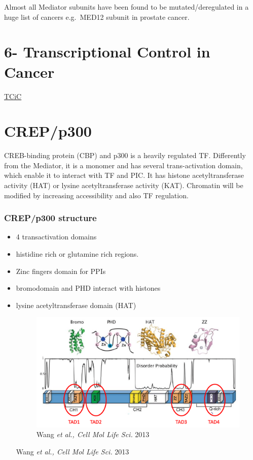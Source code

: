 Almost all Mediator subunits have been found to be mutated/deregulated in a huge list of cancers e.g.~MED12 subunit in prostate cancer.

\hypertarget{transcriptional-control-in-cancer}{%
\section{6- Transcriptional Control in Cancer}\label{transcriptional-control-in-cancer}}

\href{https://www.notion.so/TCiC-08701b51973a4b22a16e226a1fbd7e9b}{TCiC}

\hypertarget{crepp300}{%
\section{CREP/p300}\label{crepp300}}

CREB-binding protein (CBP) and p300 is a heavily regulated TF. Differently from the Mediator, it is a monomer and has several trans-activation domain, which enable it to interact with TF and PIC. It has histone acetyltransferase activity (HAT) or lysine acetyltransferase activity (KAT). Chromatin will be modified by increasing accessibility and also TF regulation.

\hypertarget{crepp300-structure}{%
\subsubsection{CREP/p300 structure}\label{crepp300-structure}}

\begin{itemize}
\item
  4 transactivation domains
\item
  histidine rich or glutamine rich regions.
\item
  Zinc fingers domain for PPIs
\item
  bromodomain and PHD interact with histones
\item
  lysine acetyltransferase domain (HAT)

  \begin{figure}
  \centering
  \includegraphics[width=\textwidth]{../_resources/Screenshot_2022-10-12_at_08-56-06.png}
  \caption{Wang \emph{et al., Cell Mol Life Sci.} 2013}
  \end{figure}

  Wang \emph{et al., Cell Mol Life Sci.} 2013
\end{itemize}

